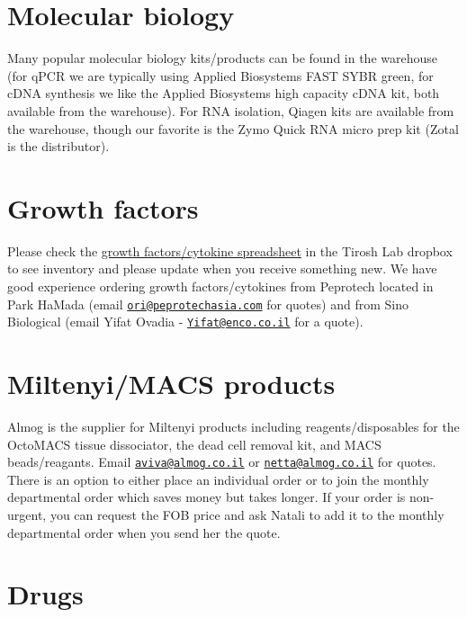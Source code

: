 \documentclass[]{book}
\begin{document}
\section{Molecular biology}\label{molecular-biology}

Many popular molecular biology kits/products can be found in the
warehouse (for qPCR we are typically using Applied Biosystems FAST SYBR
green, for cDNA synthesis we like the Applied Biosystems high capacity
cDNA kit, both available from the warehouse). For RNA isolation, Qiagen
kits are available from the warehouse, though our favorite is the Zymo
Quick RNA micro prep kit (Zotal is the distributor).

\section{Growth factors}\label{growth-factors}

Please check the
\href{https://www.dropbox.com/s/q0dn3a3th12y822/cytokines_GFs_Tirosh.xlsx?dl=0}{growth
factors/cytokine spreadsheet} in the Tirosh Lab dropbox to see inventory
and please update when you receive something new. We have good
experience ordering growth factors/cytokines from Peprotech located in
Park HaMada (email
\href{mailto:ori@peprotechasia.com}{\nolinkurl{ori@peprotechasia.com}}
for quotes) and from Sino Biological (email Yifat Ovadia -
\href{mailto:Yifat@enco.co.il}{\nolinkurl{Yifat@enco.co.il}} for a
quote).

\section{Miltenyi/MACS products}\label{miltenyimacs-products}

Almog is the supplier for Miltenyi products including
reagents/disposables for the OctoMACS tissue dissociator, the dead cell
removal kit, and MACS beads/reagants. Email
\href{mailto:aviva@almog.co.il}{\nolinkurl{aviva@almog.co.il}} or
\href{mailto:netta@almog.co.il}{\nolinkurl{netta@almog.co.il}} for
quotes. There is an option to either place an individual order or to
join the monthly departmental order which saves money but takes longer.
If your order is non-urgent, you can request the FOB price and ask
Natali to add it to the monthly departmental order when you send her the
quote.

\section{Drugs}\label{drugs}
\end{document}
